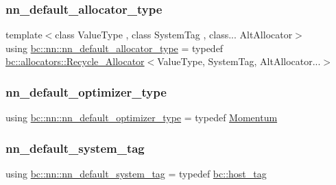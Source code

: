 \mbox{\label{namespacebc_1_1nn_a0025752fc3f47f988b3fae106c825860}} 
\subsubsection{\texorpdfstring{nn\+\_\+default\+\_\+allocator\+\_\+type}{nn\_default\_allocator\_type}}
{\footnotesize\ttfamily template$<$class Value\+Type , class System\+Tag , class... Alt\+Allocator$>$ \\
using \hyperlink{namespacebc_1_1nn_a0025752fc3f47f988b3fae106c825860}{bc\+::nn\+::nn\+\_\+default\+\_\+allocator\+\_\+type} = typedef \hyperlink{structbc_1_1allocators_1_1Recycle__Allocator}{bc\+::allocators\+::\+Recycle\+\_\+\+Allocator}$<$Value\+Type, System\+Tag, Alt\+Allocator...$>$}

\mbox{\label{namespacebc_1_1nn_ad8fbb567f69851a9636db98901712535}} 
\subsubsection{\texorpdfstring{nn\+\_\+default\+\_\+optimizer\+\_\+type}{nn\_default\_optimizer\_type}}
{\footnotesize\ttfamily using \hyperlink{namespacebc_1_1nn_ad8fbb567f69851a9636db98901712535}{bc\+::nn\+::nn\+\_\+default\+\_\+optimizer\+\_\+type} = typedef \hyperlink{structbc_1_1nn_1_1Momentum}{Momentum}}

\mbox{\label{namespacebc_1_1nn_a17bbb7ff945016ee40da7ebbd272f4a2}} 
\subsubsection{\texorpdfstring{nn\+\_\+default\+\_\+system\+\_\+tag}{nn\_default\_system\_tag}}
{\footnotesize\ttfamily using \hyperlink{namespacebc_1_1nn_a17bbb7ff945016ee40da7ebbd272f4a2}{bc\+::nn\+::nn\+\_\+default\+\_\+system\+\_\+tag} = typedef \hyperlink{structbc_1_1host__tag}{bc\+::host\+\_\+tag}}



